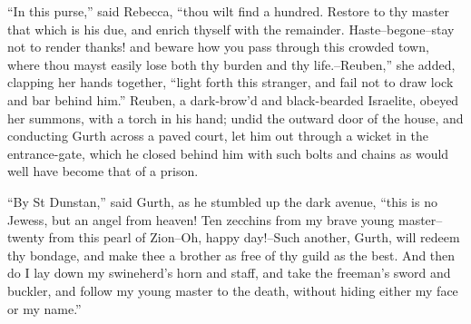 ``In this purse,'' said Rebecca, ``thou wilt find a hundred. Restore to
thy master that which is his due, and enrich thyself with the remainder.
Haste--begone--stay not to render thanks! and beware how you pass
through this crowded town, where thou mayst easily lose both thy burden
and thy life.--Reuben,'' she added, clapping her hands together, ``light
forth this stranger, and fail not to draw lock and bar behind him.''
Reuben, a dark-brow'd and black-bearded Israelite, obeyed her summons,
with a torch in his hand; undid the outward door of the house, and
conducting Gurth across a paved court, let him out through a wicket in
the entrance-gate, which he closed behind him with such bolts and chains
as would well have become that of a prison.

``By St Dunstan,'' said Gurth, as he stumbled up the dark avenue, ``this
is no Jewess, but an angel from heaven! Ten zecchins from my brave young
master--twenty from this pearl of Zion--Oh, happy day!--Such another,
Gurth, will redeem thy bondage, and make thee a brother as free of thy
guild as the best. And then do I lay down my swineherd's horn and staff,
and take the freeman's sword and buckler, and follow my young master to
the death, without hiding either my face or my name.''
